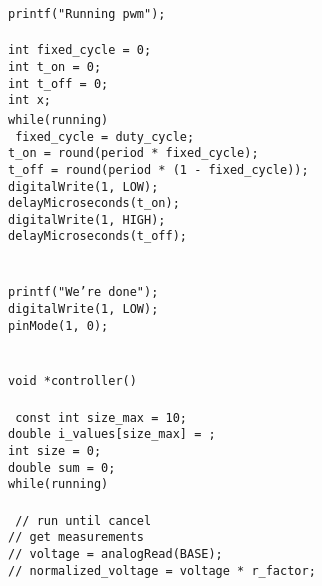 \documentclass[a4paper, 12pt]{article}
\begin{document}
\begin{appendices}
{	\texttt{printf("Running pwm\n");} \\\noindent
	\texttt{ \\\noindent}
	\texttt{int fixed\_cycle = 0;} \\\noindent
	\texttt{int t\_on = 0;} \\\noindent
	\texttt{int t\_off = 0;} \\\noindent
	\texttt{int x;} \\\noindent
	\texttt{while(running){ \\\noindent}
	\texttt{fixed\_cycle = duty\_cycle;} \\\noindent
	\texttt{t\_on = round(period * fixed\_cycle);} \\\noindent
	\texttt{t\_off = round(period * (1 - fixed\_cycle));} \\\noindent
	\texttt{digitalWrite(1, LOW);} \\\noindent
	\texttt{delayMicroseconds(t\_on);} \\\noindent
	\texttt{digitalWrite(1, HIGH);} \\\noindent
	\texttt{delayMicroseconds(t\_off);} \\\noindent
	\texttt{}} \\\noindent
	\texttt{} \\\noindent
	\texttt{printf("We're done\n");} \\\noindent
	\texttt{digitalWrite(1, LOW);} \\\noindent
	\texttt{pinMode(1, 0);} \\\noindent
	\texttt{}} \\\noindent
	\texttt{ \\\noindent}
	\texttt{void *controller()} \\\noindent
	\texttt{{ \\\noindent}
	\texttt{const int size\_max = 10;} \\\noindent
	\texttt{double i\_values[size\_max] = {};} \\\noindent
	\texttt{int size = 0;} \\\noindent
	\texttt{double sum = 0;} \\\noindent
	\texttt{while(running)} \\\noindent
	\texttt{{ \\\noindent}
	\texttt{// run until cancel} \\\noindent
	\texttt{// get measurements} \\\noindent
	\texttt{// voltage = analogRead(BASE);} \\\noindent
	\texttt{// normalized\_voltage = voltage * r\_factor;} \\\noindent
}}
\end{appendices}
\end{document}
